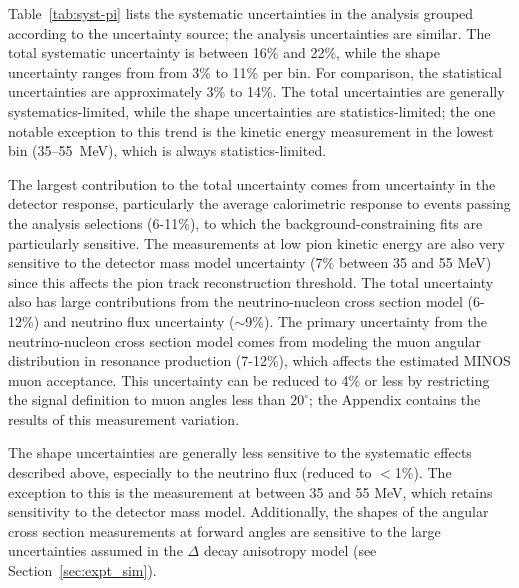Table~\ref{tab:syst-pi} lists the systematic 
uncertainties in the \cconepi analysis grouped according to the uncertainty source; the \ccpi analysis uncertainties are similar.  The total systematic 
uncertainty is between 16\% and 22\%, while the shape uncertainty ranges from from 3\% to 11\% per bin.  For comparison, the statistical uncertainties 
are approximately 3\% to 14\%.  The total uncertainties are generally systematics-limited, while the shape uncertainties are statistics-limited; the one 
notable exception to this trend is the kinetic energy measurement in the lowest bin (35--55~MeV), which is always statistics-limited.



The largest contribution to the total uncertainty comes from uncertainty in the detector response, particularly the average calorimetric response to 
events passing the analysis selections (6-11\%), to which the background-constraining fits are particularly sensitive.  The measurements at low pion 
kinetic energy are also very sensitive to the detector mass model uncertainty (7\% between 35 and 55 MeV) since this affects the pion track 
reconstruction threshold.  The total uncertainty also has large contributions from the neutrino-nucleon cross section model (6-12\%) and neutrino flux 
uncertainty ($\sim$9\%).  The primary uncertainty from the neutrino-nucleon cross section model comes from modeling the muon angular 
distribution in resonance production (7-12\%), which affects the estimated MINOS muon acceptance.  This uncertainty can be reduced to 4\% or less by
restricting the signal definition to muon angles less than $20^\circ$; the Appendix contains the results of this measurement variation.

The shape uncertainties are generally less sensitive to the systematic effects described above, especially to the neutrino flux (reduced to $<$1\%).  The exception to this 
is the measurement at \Tpi between 35 and 55 MeV, which retains sensitivity to the detector mass model.  Additionally, the shapes of the angular 
cross section measurements at forward angles are sensitive to the large uncertainties assumed in the $\Delta$ decay anisotropy model 
(see Section~\ref{sec:expt_sim}).

  





